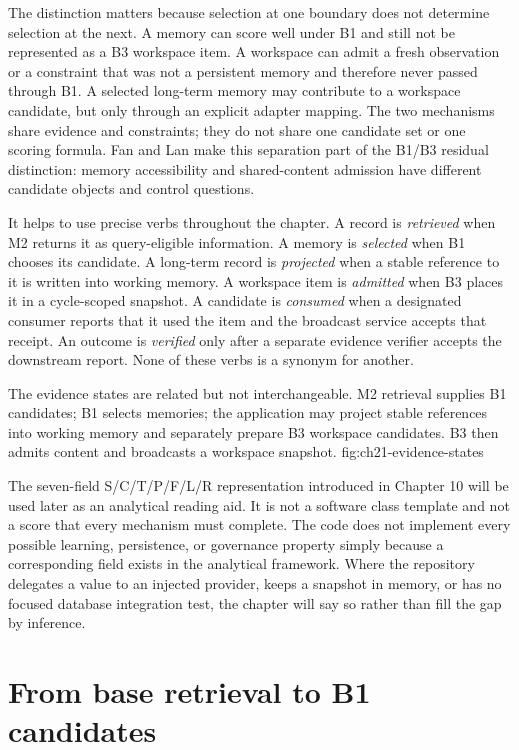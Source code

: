 The distinction matters because selection at one boundary does not determine selection at the next. A memory can score well under B1 and still not be represented as a B3 workspace item. A workspace can admit a fresh observation or a constraint that was not a persistent memory and therefore never passed through B1. A selected long-term memory may contribute to a workspace candidate, but only through an explicit adapter mapping. The two mechanisms share evidence and constraints; they do not share one candidate set or one scoring formula. Fan and Lan make this separation part of the B1/B3 residual distinction: memory accessibility and shared-content admission have different candidate objects and control questions.

It helps to use precise verbs throughout the chapter. A record is \emph{retrieved} when M2 returns it as query-eligible information. A memory is \emph{selected} when B1 chooses its candidate. A long-term record is \emph{projected} when a stable reference to it is written into working memory. A workspace item is \emph{admitted} when B3 places it in a cycle-scoped snapshot. A candidate is \emph{consumed} when a designated consumer reports that it used the item and the broadcast service accepts that receipt. An outcome is \emph{verified} only after a separate evidence verifier accepts the downstream report. None of these verbs is a synonym for another.

  {The evidence states are related but not interchangeable. M2 retrieval supplies B1 candidates; B1 selects memories; the application may project stable references into working memory and separately prepare B3 workspace candidates. B3 then admits content and broadcasts a workspace snapshot.}
  {fig:ch21-evidence-states}

The seven-field S/C/T/P/F/L/R representation introduced in Chapter 10 will be used later as an analytical reading aid. It is not a software class template and not a score that every mechanism must complete. The code does not implement every possible learning, persistence, or governance property simply because a corresponding field exists in the analytical framework. Where the repository delegates a value to an injected provider, keeps a snapshot in memory, or has no focused database integration test, the chapter will say so rather than fill the gap by inference.

\section{From base retrieval to B1 candidates}
\label{sec:ch21-b1-runtime}

